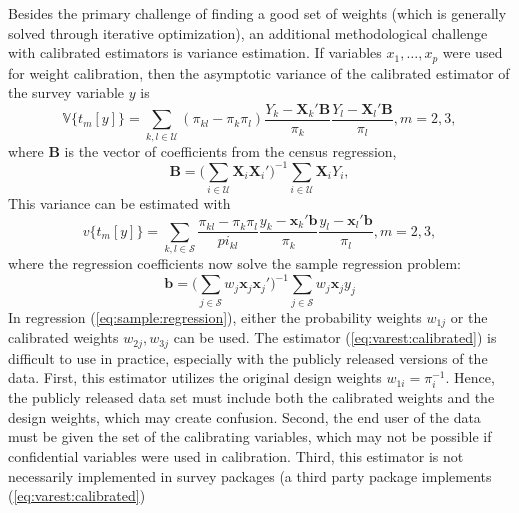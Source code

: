 Besides the primary challenge of finding a good set of weights
(which is generally solved through iterative optimization),
an additional methodological challenge with calibrated estimators
is variance estimation. If variables $x_1,\ldots,x_p$ were used
for weight calibration, then the asymptotic variance of the calibrated
estimator of the survey variable $y$ is
\begin{equation}
    \mathbb{V}\bigl\{t_{m}[y]\bigr\} = \sum_{k,l \in \mathcal{U}}
        (\pi_{kl}-\pi_k \pi_l)
        \frac{Y_k - \mathbf{X}_k ' \mathbf{B}}{\pi_k}
        \frac{Y_l - \mathbf{X}_l ' \mathbf{B}}{\pi_l}, m=2,3,
    \label{eq:var:calibrated}
\end{equation}
where $\mathbf{B}$ is the vector of coefficients from the
census regression,
\begin{equation}
    \mathbf{B}
    = \bigl( \sum_{i \in \mathcal{U}} \mathbf{X}_i \mathbf{X}_i' )^{-1}
      \sum_{i \in \mathcal{U}} \mathbf{X}_i Y_i
    \label{eq:census:regression},
\end{equation}
This variance can be estimated with
\begin{equation}
    v\bigl\{t_{m}[y]\bigr\} = \sum_{k,l \in \mathcal{S}}
        \frac{\pi_{kl}-\pi_k \pi_l}{pi_{kl}}
        \frac{y_k - \mathbf{x}_k ' \mathbf{b}}{\pi_k}
        \frac{y_l - \mathbf{x}_l ' \mathbf{b}}{\pi_l}, m=2,3,
    \label{eq:varest:calibrated}
\end{equation}
where the regression coefficients now solve the sample
regression problem:
\begin{equation}
    \mathbf{b}
    = \bigl( \sum_{j \in \mathcal{S}} w_j \mathbf{x}_j \mathbf{x}_j' )^{-1}
      \sum_{j \in \mathcal{S}} w_j \mathbf{x}_j y_j
    \label{eq:sample:regression}
\end{equation}
In regression (\ref{eq:sample:regression}),
either the probability weights $w_{1j}$ or the calibrated weights
$w_{2j}, w_{3j}$ can be used. The estimator (\ref{eq:varest:calibrated})
is difficult to use in practice, especially with the publicly released
versions of the data. First, this estimator utilizes the original design weights
$w_{1i}=\pi_i^{-1}$. Hence, the publicly released data set must include
both the calibrated weights and the design weights, which may create
confusion. Second, the end user
of the data must be given the set of the calibrating variables, which may
not be possible if confidential variables were used in calibration. Third,
this estimator is not necessarily implemented in survey packages
(a third party package  implements (\ref{eq:varest:calibrated})
